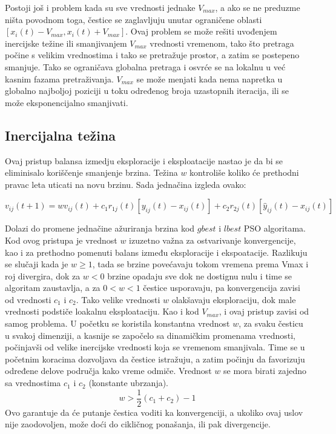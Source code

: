 \documentclass[a4paper]{article}
\begin{document}
Postoji još i problem kada su sve vrednosti jednake $V_{max}$, a ako se ne preduzme ništa povodnom toga, čestice se zaglavljuju unutar ograničene oblasti $[x_i(t)-V_{max} , x_i(t) + V_{max} ]$.  Ovaj problem se može rešiti uvođenjem inercijske težine ili smanjivanjem  $V_{max}$ vrednosti vremenom, tako što pretraga počine s velikim vrednostima i tako se pretražuje prostor, a zatim se postepeno smanjuje. Tako se ograničava globalna pretraga i osvrće se na lokalnu u već kasnim fazama pretraživanja. $V_{max}$ se može menjati kada nema napretka u globalno najboljoj poziciji u toku određenog broja uzastopnih iteracija, ili se može eksponencijalno smanjivati.

\subsection{Inercijalna težina}
Ovaj pristup balansa izmedju eksploracije i eksploatacije nastao je da bi se eliminisalo koriščenje smanjenje brzina. Težina $w$  kontroliše koliko će prethodni pravac leta uticati na novu brzinu. Sada jednačina izgleda ovako:

\[v_{ij}(t+1) = wv_{ij}(t) + c_1r_{1j}(t)[y_{ij}(t) - x_{ij}(t)] + c_2r_{2j}(t)[\hat{y}_{ij}(t) - x_{ij}(t)] \]

Dolazi do promene jednačine ažuriranja brzina kod $gbest$ i $lbest$ PSO algoritama.
Kod ovog pristupa je vrednost $w$ izuzetno važna za ostvarivanje konvergencije, kao i za prethodno pomenuti balans između eksploracije i ekspoatacije. Razlikuju se slučaji kada je $w ≥ 1$, tada se brzine povećavaju tokom vremena prema Vmax i roj divergira, dok za $w < 0$ brzine opadaju sve dok ne dostignu nulu i time se algoritam zaustavlja, a za $0 < w < 1$ čestice usporavaju, pa konvergencija zavisi od vrednosti $c_1$ i $c_2$. Tako velike vrednosti  $w$ olakšavaju eksploraciju, dok male vrednosti podstiče loakalnu eksploataciju. 
Kao i kod $V_{max}$, i ovaj pristup zavisi od samog problema. U početku se koristila konstantna vrednost $w$, za svaku česticu u svakoj dimenziji, a kasnije se započelo sa dinamičkim promenama vrednosti, počinjavši od velike inercijske vrednosti koja se vremenom smanjivala. Time se u početnim koracima dozvoljava da čestice istražuju, a zatim počinju da favorizuju određene delove područja kako vreme odmiče.
Vrednost $w$ se mora birati zajedno sa vrednostima $c_1$ i $c_2$ (konstante ubrzanja). $$w > \frac{1}{2}(c_1 + c_2) - 1$$ Ovo garantuje da će putanje čestica voditi ka konvergenciji, a ukoliko ovaj uslov nije zaodovoljen, može doći do cikličnog ponašanja, ili pak divergencije.
\end{document}
